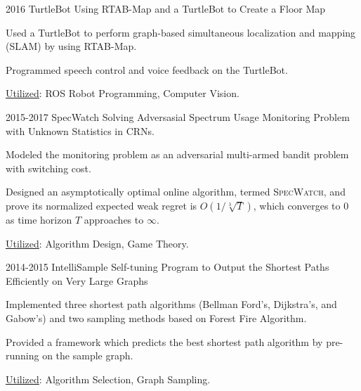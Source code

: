 \begin{cventries}
	\cvprojectentry
	{2016 TurtleBot}
	{Using RTAB-Map and a TurtleBot to Create a Floor Map}
	{
		\begin{cvitems} %
			\item Used a TurtleBot to perform graph-based simultaneous localization and mapping (SLAM) by using RTAB-Map.
			\item Programmed speech control and voice feedback on the TurtleBot.
			\item  \underline{Utilized}: ROS Robot Programming, Computer Vision.
		\end{cvitems}
	}
	
	
	
	
	\cvprojectentry
	{2015-2017 SpecWatch} %
	{Solving Adversasial Spectrum Usage Monitoring Problem with Unknown Statistics in CRNs.} %
	{
		\begin{cvitems} %
			\item Modeled the monitoring problem as an adversarial multi-armed bandit problem with switching cost.
			\item
			Designed an asymptotically optimal online algorithm, termed {\textsc{SpecWatch}}, and prove its normalized expected weak regret is $O(1/\sqrt[3]{T})$, which converges to 0 as time horizon $T$ approaches to $\infty$. 
			\item  \underline{Utilized}: Algorithm Design, Game Theory.
		\end{cvitems}
	}
	
	\cvprojectentry
	{2014-2015 IntelliSample} %
	{Self-tuning Program to Output the Shortest Paths Efficiently on Very Large Graphs} %
	{
		\begin{cvitems} %
			\item Implemented three shortest path algorithms (Bellman Ford's, Dijkstra's, and Gabow's) and two sampling methods based on Forest Fire Algorithm.
			\item Provided a framework which predicts the best shortest path algorithm by pre-running on the sample graph.
			\item  \underline{Utilized}: Algorithm Selection, Graph Sampling.
		\end{cvitems}
	}
	

\end{cventries}
